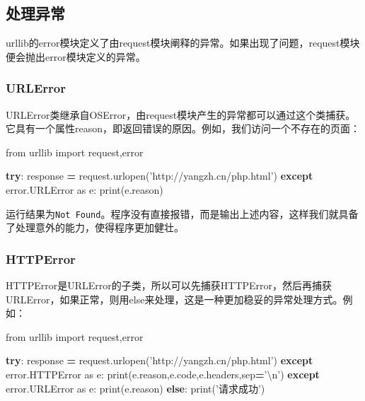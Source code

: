 \documentclass[]{ctexbook}
\newenvironment{Shaded}{\begin{snugshade}}{\end{snugshade}}
\newcommand{\BuiltInTok}[1]{#1}
\newcommand{\CharTok}[1]{\textcolor[rgb]{0.31,0.60,0.02}{#1}}
\newcommand{\ControlFlowTok}[1]{\textcolor[rgb]{0.13,0.29,0.53}{\textbf{#1}}}
\newcommand{\ImportTok}[1]{#1}
\newcommand{\NormalTok}[1]{#1}
\newcommand{\OperatorTok}[1]{\textcolor[rgb]{0.81,0.36,0.00}{\textbf{#1}}}
\newcommand{\StringTok}[1]{\textcolor[rgb]{0.31,0.60,0.02}{#1}}
\begin{document}
\hypertarget{ux5904ux7406ux5f02ux5e38}{%
\subsection{处理异常}\label{ux5904ux7406ux5f02ux5e38}}

urllib的error模块定义了由request模块阐释的异常。如果出现了问题，request模块便会抛出error模块定义的异常。

\hypertarget{urlerror}{%
\subsubsection{URLError}\label{urlerror}}

URLError类继承自OSError，由request模块产生的异常都可以通过这个类捕获。它具有一个属性reason，即返回错误的原因。例如，我们访问一个不存在的页面：

\begin{Shaded}
\begin{Highlighting}[]
\ImportTok{from}\NormalTok{ urllib }\ImportTok{import}\NormalTok{ request,error}

\ControlFlowTok{try}\NormalTok{:}
\NormalTok{    response }\OperatorTok{=}\NormalTok{ request.urlopen(}\StringTok{'http://yangzh.cn/php.html'}\NormalTok{)}
\ControlFlowTok{except}\NormalTok{ error.URLError }\ImportTok{as}\NormalTok{ e:}
    \BuiltInTok{print}\NormalTok{(e.reason)}
\end{Highlighting}
\end{Shaded}

运行结果为\texttt{Not\ Found}。程序没有直接报错，而是输出上述内容，这样我们就具备了处理意外的能力，使得程序更加健壮。

\hypertarget{httperror}{%
\subsubsection{HTTPError}\label{httperror}}

HTTPError是URLError的子类，所以可以先捕获HTTPError，然后再捕获URLError，如果正常，则用else来处理，这是一种更加稳妥的异常处理方式。例如：

\begin{Shaded}
\begin{Highlighting}[]
\ImportTok{from}\NormalTok{ urllib }\ImportTok{import}\NormalTok{ request,error}

\ControlFlowTok{try}\NormalTok{:}
\NormalTok{    response }\OperatorTok{=}\NormalTok{ request.urlopen(}\StringTok{'http://yangzh.cn/php.html'}\NormalTok{)}
\ControlFlowTok{except}\NormalTok{ error.HTTPError }\ImportTok{as}\NormalTok{ e:}
    \BuiltInTok{print}\NormalTok{(e.reason,e.code,e.headers,sep}\OperatorTok{=}\StringTok{'}\CharTok{\textbackslash{}n}\StringTok{'}\NormalTok{)}
\ControlFlowTok{except}\NormalTok{ error.URLError }\ImportTok{as}\NormalTok{ e:}
    \BuiltInTok{print}\NormalTok{(e.reason)}
\ControlFlowTok{else}\NormalTok{:}
    \BuiltInTok{print}\NormalTok{(}\StringTok{'请求成功'}\NormalTok{)}
\end{Highlighting}
\end{Shaded}
\end{document}
